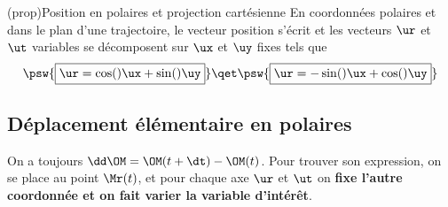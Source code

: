 \documentclass[../../main/main.tex]{subfiles}
\begin{document}
\begin{tcb*}(prop){Position en polaires et projection cartésienne}
	En coordonnées polaires et dans le plan d'une trajectoire, le vecteur
	position s'écrit
	\psw{\[\boxed{\OM = r\ur}\]}
	et les vecteurs $\ur$ et $\ut$ variables se décomposent sur $\ux$ et $\uy$
	fixes tels que
	\[
		\psw{\boxed{\ur = \cos(\tt)\ux + \sin(\tt)\uy}}
		\qet
		\psw{\boxed{\ur = -\sin(\tt)\ux + \cos(\tt)\uy}}
  \]
\end{tcb*}

\subsection{Déplacement élémentaire en polaires}
On a toujours $\dd\OM = \OM(t+\dt) - \OM(t)$. Pour trouver son expression, on se
place au point $\Mr (t)$, et pour chaque axe $\ur$ et $\ut$ on \textbf{fixe
l'autre coordonnée et on fait varier la variable d'intérêt}.
\end{document}
